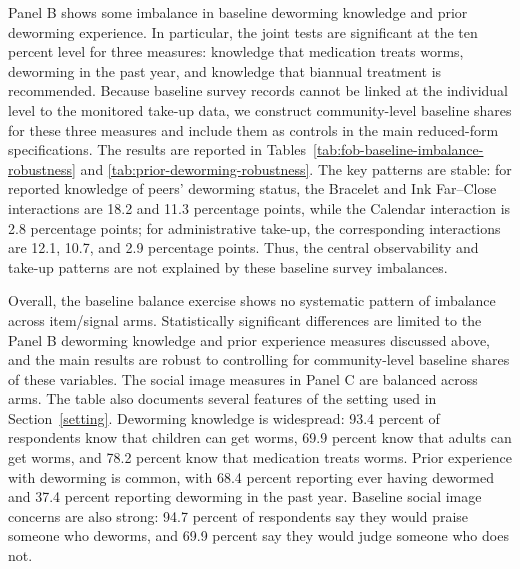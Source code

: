 \documentclass[ECM\space ReStud.tex]{subfiles}
\begin{document}
  Panel B shows some imbalance in baseline deworming knowledge and prior deworming
  experience. In particular, the joint tests are significant at the ten percent
  level for three measures: knowledge that medication treats worms, deworming in the
  past year, and knowledge that biannual treatment is recommended. Because baseline
  survey records cannot be linked at the individual level to the monitored
  take-up data, we construct community-level baseline
  shares for these three measures and include them as controls in the main reduced-form specifications. The results are reported in Tables~\ref{tab:fob-baseline-imbalance-robustness} and \ref{tab:prior-deworming-robustness}. The key patterns
  are stable: for reported knowledge of peers' deworming status, the Bracelet and
  Ink Far--Close interactions are 18.2 and 11.3 percentage points, while the
  Calendar interaction is 2.8 percentage points; for administrative take-up, the
  corresponding interactions are 12.1, 10.7, and 2.9 percentage points. Thus, the
  central observability and take-up patterns are not explained by these baseline
  survey imbalances.

  Overall, the baseline balance exercise shows no systematic pattern of imbalance across item/signal arms. Statistically significant differences are limited to the Panel B deworming knowledge and prior experience measures discussed above, and the main results are robust to controlling for community-level baseline shares of these variables. The social image measures in Panel C are balanced across arms. The table also documents several features of the setting used in Section~\ref{setting}. Deworming knowledge is widespread: 93.4 percent of respondents know that children can get worms, 69.9 percent know that adults can get worms, and 78.2 percent know that medication treats worms. Prior experience with deworming is common, with 68.4 percent reporting ever having dewormed and 37.4 percent reporting deworming in the past year. Baseline social image concerns are also strong: 94.7 percent of respondents say they would praise someone who deworms, and 69.9 percent say they would judge someone who does not.


\end{document}
